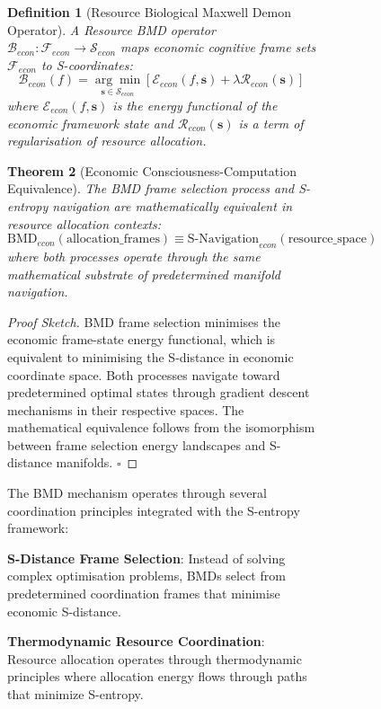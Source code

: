 \documentclass[12pt,a4paper]{article}
\newtheorem{theorem}{Theorem}
\newtheorem{definition}[theorem]{Definition}
\begin{document}
\begin{figure}[H]
\begin{figure}[H]
\begin{definition}[Resource Biological Maxwell Demon Operator]
A Resource BMD operator $\mathcal{B}_{econ}: \mathcal{F}_{econ} \to \mathcal{S}_{econ}$ maps economic cognitive frame sets $\mathcal{F}_{econ}$ to S-coordinates:
\begin{equation}
\mathcal{B}_{econ}(f) = \underset{\mathbf{s} \in \mathcal{S}_{econ}}{\arg\min} \left[ \mathcal{E}_{econ}(f, \mathbf{s}) + \lambda \mathcal{R}_{econ}(\mathbf{s}) \right]
\end{equation}
where $\mathcal{E}_{econ}(f, \mathbf{s})$ is the energy functional of the economic framework state and $\mathcal{R}_{econ}(\mathbf{s})$ is a term of regularisation of resource allocation.
\end{definition}

\begin{theorem}[Economic Consciousness-Computation Equivalence]
The BMD frame selection process and S-entropy navigation are mathematically equivalent in resource allocation contexts:
\begin{equation}
\text{BMD}_{econ}(\text{allocation\_frames}) \equiv \text{S-Navigation}_{econ}(\text{resource\_space})
\end{equation}
where both processes operate through the same mathematical substrate of predetermined manifold navigation.
\end{theorem}

\begin{proof}[Proof Sketch]
BMD frame selection minimises the economic frame-state energy functional, which is equivalent to minimising the S-distance in economic coordinate space. Both processes navigate toward predetermined optimal states through gradient descent mechanisms in their respective spaces. The mathematical equivalence follows from the isomorphism between frame selection energy landscapes and S-distance manifolds. $\square$
\end{proof}



The BMD mechanism operates through several coordination principles integrated with the S-entropy framework:

\textbf{S-Distance Frame Selection}: Instead of solving complex optimisation problems, BMDs select from predetermined coordination frames that minimise economic S-distance.

\textbf{Thermodynamic Resource Coordination}: Resource allocation operates through thermodynamic principles where allocation energy flows through paths that minimize S-entropy.


\end{figure}
\end{figure}
\end{document}

